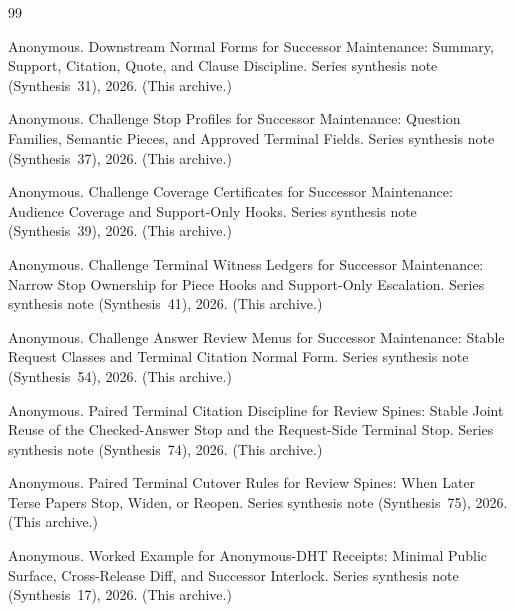 \documentclass[11pt]{article}
\begin{document}
\begin{thebibliography}{99}\small

Anonymous.
\newblock Downstream Normal Forms for Successor Maintenance: Summary, Support, Citation, Quote, and Clause Discipline.
\newblock Series synthesis note (Synthesis~31), 2026. (This archive.)

Anonymous.
\newblock Challenge Stop Profiles for Successor Maintenance: Question Families, Semantic Pieces, and Approved Terminal Fields.
\newblock Series synthesis note (Synthesis~37), 2026. (This archive.)

Anonymous.
\newblock Challenge Coverage Certificates for Successor Maintenance: Audience Coverage and Support-Only Hooks.
\newblock Series synthesis note (Synthesis~39), 2026. (This archive.)

Anonymous.
\newblock Challenge Terminal Witness Ledgers for Successor Maintenance: Narrow Stop Ownership for Piece Hooks and Support-Only Escalation.
\newblock Series synthesis note (Synthesis~41), 2026. (This archive.)

Anonymous.
\newblock Challenge Answer Review Menus for Successor Maintenance: Stable Request Classes and Terminal Citation Normal Form.
\newblock Series synthesis note (Synthesis~54), 2026. (This archive.)

Anonymous.
\newblock Paired Terminal Citation Discipline for Review Spines: Stable Joint Reuse of the Checked-Answer Stop and the Request-Side Terminal Stop.
\newblock Series synthesis note (Synthesis~74), 2026. (This archive.)

Anonymous.
\newblock Paired Terminal Cutover Rules for Review Spines: When Later Terse Papers Stop, Widen, or Reopen.
\newblock Series synthesis note (Synthesis~75), 2026. (This archive.)

Anonymous.
\newblock Worked Example for Anonymous-DHT Receipts: Minimal Public Surface, Cross-Release Diff, and Successor Interlock.
\newblock Series synthesis note (Synthesis~17), 2026. (This archive.)

\end{thebibliography}
\end{document}
